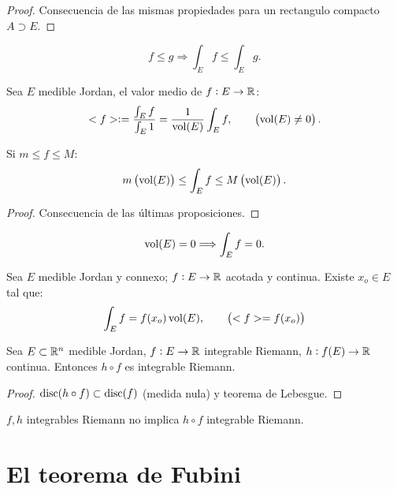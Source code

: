\begin{proof}
    Consecuencia de las mismas propiedades para un rectangulo compacto $A \supset E$.
\end{proof}

\begin{col}[Monotonía]
    \[
    f \leq g \Longrightarrow \int_E f \leq \int_E g.
    \]
\end{col}

\begin{defi}
    Sea $E$ medible Jordan, el valor medio de $f : E \to \mathbb{R} $:
    \[
    <f> := \frac{\int_E f}{\int_E 1} = \frac{1}{\operatorname{vol}(E)} \int_E f, \qquad \left( \operatorname{vol}(E) \neq 0 \right).
    \]
\end{defi}

\begin{teo}
    Si $m \leq f \leq M$:
    \[
    m \left( \operatorname{vol}(E) \right) \leq \int_E f \leq M \left( \operatorname{vol}(E) \right).
    \]
\end{teo}

\begin{proof}
    Consecuencia de las últimas proposiciones.
\end{proof}

\begin{col}
    \[
    \operatorname{vol}(E) = 0 \Longrightarrow \int_E f = 0.
    \]
\end{col}

\begin{teo}
    Sea $E$ medible Jordan y connexo; $f : E \to \mathbb{R}$ acotada y continua. Existe $x_o \in E$ tal que:
    \[
    \int_E f = f(x_o) \operatorname{vol}(E), \qquad \left( <f> = f(x_o) \right)
    \]
\end{teo}

\begin{prop}
    Sea $E \subset \mathbb{R}^n$ medible Jordan, $f : E \to \mathbb{R}$ integrable Riemann, $h : f(E) \to \mathbb{R}$ continua. Entonces $h \circ f$ es integrable Riemann.
\end{prop}

\begin{proof}
    $\operatorname{disc}(h \circ f) \subset \operatorname{disc}(f)$ (medida nula) y teorema de Lebesgue.
\end{proof}

\begin{obs*}
    $f,h$ integrables Riemann no implica $h \circ f$ integrable Riemann.
\end{obs*}

\section{El teorema de Fubini}

